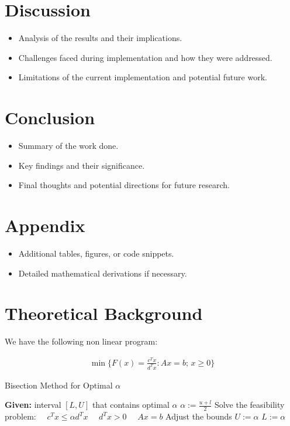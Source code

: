 \documentclass[10pt,a4paper]{article}
\begin{document}
\section{Discussion}
\label{sec:discussion}
\begin{itemize}
	\item Analysis of the results and their implications.
	\item Challenges faced during implementation and how they were addressed.
	\item Limitations of the current implementation and potential future work.
\end{itemize}

\section{Conclusion}
\label{sec:conclusion}
\begin{itemize}
	\item Summary of the work done.
	\item Key findings and their significance.
	\item Final thoughts and potential directions for future research.
\end{itemize}

\appendix
\section{Appendix}
\begin{itemize}
	\item Additional tables, figures, or code snippets.
	\item Detailed mathematical derivations if necessary.
\end{itemize}




\section*{Theoretical Background}

We have the following non linear program:

\begin{equation}\label{eq:3}
	\begin{aligned}
		\min \{ F(x) = \frac{c^T x}{d^T x} : A x = b; \, x \geq 0 \}
	\end{aligned}
\end{equation}



\begin{algorithm}
	\caption{Bisection Method for Optimal $\alpha$}
	\begin{algorithmic}[1]
		\State \textbf{Given:} interval $[L, U]$ that contains optimal $\alpha$
		\Repeat
		\State $\alpha := \frac{u + l}{2}$
		\State Solve the feasibility problem:
		\State $\quad c^T x \leq \alpha d^T x $
		\State $\quad d^T x > 0$
		\State $\quad Ax = b$
		\State Adjust the bounds
		\State $U := \alpha$
		\Else
		\State $L := \alpha$
		\EndIf
	\end{algorithmic}
\end{algorithm}
\end{document}
